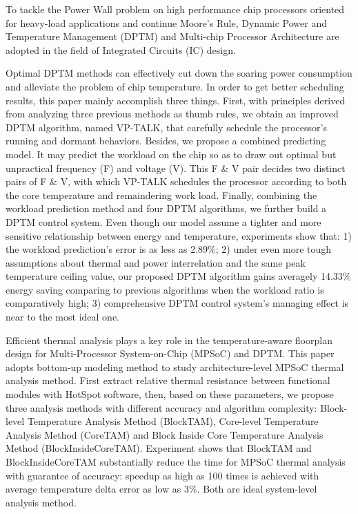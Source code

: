 
\begin{eabstract}


To tackle the Power Wall problem on high performance chip processors oriented for heavy-load applications and continue Moore's Rule, Dynamic Power and Temperature Management (DPTM) and Multi-chip Processor Architecture are adopted in the field of Integrated Circuits (IC) design.

Optimal DPTM methods can effectively cut down the soaring power consumption and alleviate the problem of chip temperature. In order to get better scheduling results, this paper mainly accomplish three things. First, with principles derived from analyzing three previous methods as thumb rules, we obtain an improved DPTM algorithm, named VP-TALK, that carefully schedule the processor's running and dormant behaviors. Besides, we propose a combined predicting model. It may predict the workload on the chip so as to draw out optimal but unpractical frequency (F) and voltage (V). This F \& V pair decides two distinct pairs of F \& V, with which VP-TALK schedules the processor according to both the core temperature and remaindering work load. Finally, combining the workload prediction method and four DPTM algorithms, we further build a DPTM control system. Even though our model assume a tighter and more sensitive relationship between energy and temperature, experiments show that: 1) the workload prediction's error is as less as 2.89\%; 2) under even more tough assumptions about thermal and power interrelation and the same peak temperature ceiling value, our proposed DPTM algorithm gains averagely 14.33\% energy saving comparing to previous algorithms when the workload ratio is comparatively high; 3) comprehensive DPTM control system's managing effect is near to the most ideal one.


Efficient thermal analysis plays a key role in the temperature-aware floorplan design for Multi-Processor System-on-Chip (MPSoC) and DPTM. This paper adopts bottom-up modeling method to study architecture-level MPSoC thermal analysis method. First extract relative thermal resistance between functional modules with HotSpot software, then, based on these parameters, we propose three analysis methods with different accuracy and algorithm complexity: Block-level Temperature Analysis Method (BlockTAM), Core-level Temperature Analysis Method (CoreTAM) and Block Inside Core Temperature Analysis Method (BlockInsideCoreTAM). Experiment shows that BlockTAM and BlockInsideCoreTAM substantially reduce the time for MPSoC thermal analysis with guarantee of accuracy: speedup as high as 100 times is achieved with average temperature delta error as low as 3\%. Both are ideal system-level analysis method.

\end{eabstract}



